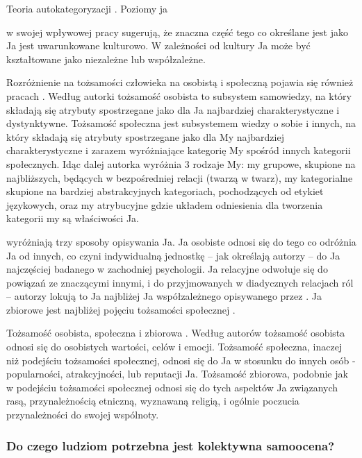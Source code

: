 \documentclass[man]{apa6}
\begin{document}
Teoria autokategoryzacji \parencite{turner1994self}.
Poziomy ja \parencite{brewer2007importance}

\textcite{markus1991culture} w swojej wpływowej pracy sugerują, że znaczna część tego co określane jest jako Ja jest uwarunkowane kulturowo. W zależności od kultury Ja może być kształtowane jako niezależne lub współzależne.

Rozróżnienie na tożsamości człowieka na osobistą i społeczną pojawia się również pracach \textcite{jarymowicz1994poznawcza}. Według autorki tożsamość osobista to subsystem samowiedzy, na który składają się atrybuty spostrzegane jako dla Ja najbardziej charakterystyczne i dystynktywne. Tożsamość społeczna jest subsystemem wiedzy o sobie i innych, na który składają się atrybuty spostrzegane jako dla My najbardziej charakterystyczne i zarazem wyróżniające kategorię My spośród innych kategorii społecznych. Idąc dalej autorka wyróżnia 3 rodzaje My: my grupowe, skupione na najbliższych, będących w bezpośredniej relacji (twarzą w twarz), my kategorialne
skupione na bardziej abstrakcyjnych kategoriach, pochodzących od etykiet językowych, oraz my atrybucyjne gdzie układem odniesienia dla tworzenia kategorii my są właściwości Ja.

\textcite{brewer1996we} wyróżniają trzy sposoby opisywania Ja. Ja osobiste odnosi się do tego co odróżnia Ja od innych, co czyni indywidualną jednostkę -- jak określają autorzy -- do Ja najczęściej badanego w zachodniej psychologii. Ja relacyjne odwołuje się do powiązań ze znaczącymi innymi, i do przyjmowanych w diadycznych relacjach ról -- autorzy lokują to Ja najbliżej Ja współzależnego opisywanego przez \textcite{markus1991culture}. Ja zbiorowe jest najbliżej pojęciu tożsamości społecznej \parencite{hogg1988social, turner1987rediscovering}.

Tożsamość osobista, społeczna i zbiorowa \parencite{cheek1989identity}. Według autorów tożsamość osobista odnosi się do osobistych wartości, celów i emocji. Tożsamość społeczna, inaczej niż podejściu tożsamości społecznej, odnosi się do Ja w stosunku do innych osób - popularności, atrakcyjności, lub reputacji Ja. Tożsamość zbiorowa, podobnie jak w podejściu tożsamości społecznej odnosi się do tych aspektów Ja związanych rasą, przynależnością etniczną, wyznawaną religią, i ogólnie poczucia przynależności do swojej wspólnoty. \\


\subsubsection{Do czego ludziom potrzebna jest kolektywna samoocena?}
\end{document}

